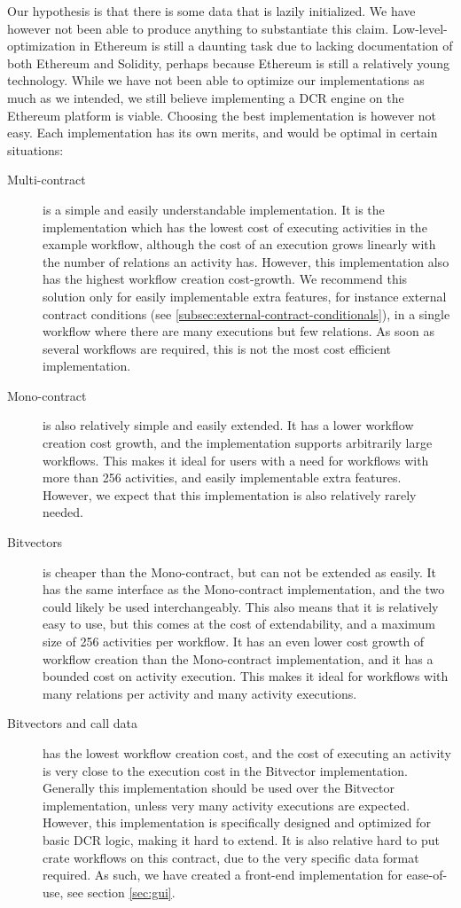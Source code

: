 \documentclass{article}
\begin{document}
	Our hypothesis is that there is some data that is lazily initialized. 
	We have however not been able to produce anything to substantiate this claim.
	Low-level-optimization in Ethereum is still a daunting task due to lacking documentation of both Ethereum and Solidity, perhaps because Ethereum is still a relatively young technology.
	While we have not been able to optimize our implementations as much as we intended, we still believe implementing a DCR engine on the Ethereum platform is viable. Choosing the best implementation is however not easy. Each implementation has its own merits, and would be optimal in certain situations:
	\begin{description}
	 	\item[Multi-contract] is a simple and easily understandable implementation. 
	 		It is the implementation which has the lowest cost of executing activities in the example workflow, although the cost of an execution grows linearly with the number of relations an activity has.
	 		However, this implementation also has the highest workflow creation cost-growth. 
	 		We recommend this solution only for easily implementable extra features, for instance external contract conditions (see \ref{subsec:external-contract-conditionals}), in a single workflow where there are many executions but few relations.
	 		As soon as several workflows are required, this is not the most cost efficient implementation.
	 	\item[Mono-contract] is also relatively simple and easily extended.
	 		It has a lower workflow creation cost growth, and the implementation supports arbitrarily large workflows. 
	 		This makes it ideal for users with a need for workflows with more than 256 activities, and easily implementable extra features.
	 		However, we expect that this implementation is also relatively rarely needed.
	 	\item[Bitvectors] is cheaper than the Mono-contract, but can not be extended as easily.
	 		It has the same interface as the Mono-contract implementation, and the two could likely be used interchangeably.
	 		This also means that it is relatively easy to use, but this comes at the cost of extendability, and a maximum size of 256 activities per workflow.
	 		It has an even lower cost growth of workflow creation than the Mono-contract implementation, and it has a bounded cost on activity execution. This makes it ideal for workflows with many relations per activity and many activity executions.
		\item[Bitvectors and call data] has the lowest workflow creation cost, and the cost of executing an activity is very close to the execution cost in the Bitvector implementation.
	 		Generally this implementation should be used over the Bitvector implementation, unless very many activity executions are expected.
	 		However, this implementation is specifically designed and optimized for basic DCR logic, making it hard to extend.
	 		It is also relative hard to put crate workflows on this contract, due to the very specific data format required. 
	 		As such, we have created a front-end implementation for ease-of-use, see section \ref{sec:gui}.
	 \end{description} 
	 
\end{document}
